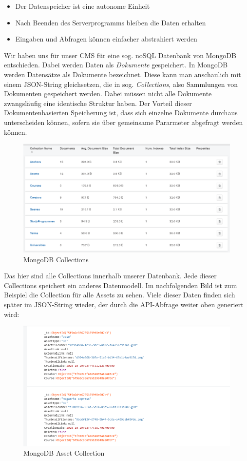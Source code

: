 \documentclass[titlepage, a4paper, 11pt]{scrartcl}
\begin{document}
        \begin{itemize}
          \item Der Datenspeicher ist eine autonome Einheit
          \item Nach Beenden des Serverprogramms bleiben die Daten erhalten
          \item Eingaben und Abfragen können einfacher abstrahiert werden
        \end{itemize}

        Wir haben uns für unser CMS für eine sog. noSQL Datenbank von MongoDB entschieden. Dabei werden Daten als \textit{Dokumente} gespeichert. 
        In MongoDB werden Datensätze als Dokumente bezeichnet. Diese kann man anschaulich mit einem JSON-String gleichsetzen, die in sog. \textit{Collections},
        also Sammlungen von Dokumenten gespeichert werden. Dabei müssen nicht alle Dokumente zwangsläufig eine identische Struktur haben.
        Der Vorteil dieser Dokumentenbasierten Speicherung ist, dass sich einzelne Dokumente durchaus unterscheiden können, sofern sie über gemeinsame Pararmeter abgefragt werden können.

        \begin{figure}[H]
          \centering
          \includegraphics[width=.8\textwidth]{MongoDB.PNG}
          \caption{MongoDB Collections}
          \label{MongoCollection}
        \end{figure}

        Das hier sind alle Collections innerhalb unserer Datenbank. Jede dieser Collections speichert ein anderes Datenmodell. Im nachfolgenden Bild ist zum Beispiel die Collection für alle Assets zu sehen.
        Viele dieser Daten finden sich später im JSON-String wieder, der durch die API-Abfrage weiter oben generiert wird:

        \begin{figure}[h]
          \centering
          \includegraphics[width=.8\textwidth]{MongoAssets.PNG}
          \caption{MongoDB Asset Collection}
          \label{MongoAssets}
        \end{figure}
\end{document}
